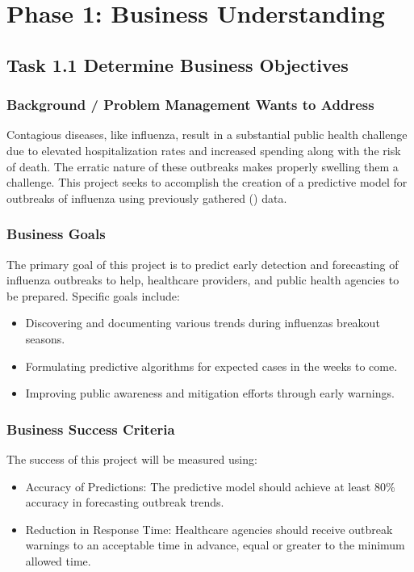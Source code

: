 \section*{Phase 1: Business Understanding}


\subsection*{Task 1.1 Determine Business Objectives}

\subsubsection*{Background / Problem Management Wants to Address}

Contagious diseases, like influenza, result in a substantial public health challenge due to elevated hospitalization rates and increased spending along with the risk of death. The erratic nature of these outbreaks makes properly swelling them a challenge. This project seeks to accomplish the creation of a predictive model for outbreaks of influenza using previously gathered (\textcite{who_gisrs}) data.

\subsubsection*{Business Goals}

The primary goal of this project is to predict early detection and forecasting of influenza outbreaks to help, healthcare providers, and public health agencies to be prepared. Specific goals include:
\begin{itemize}
  \item Discovering and documenting various trends during influenzas breakout seasons.
  \item Formulating predictive algorithms for expected cases in the weeks to come.
  \item Improving public awareness and mitigation efforts through early warnings.
\end{itemize}

\subsubsection*{Business Success Criteria}

The success of this project will be measured using:
\begin{itemize}
  \item Accuracy of Predictions: The predictive model should achieve at least 80\% accuracy in forecasting outbreak trends.
  \item Reduction in Response Time: Healthcare agencies should receive outbreak warnings to an acceptable time in advance, equal or greater to the minimum allowed time.
\end{itemize}


